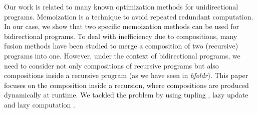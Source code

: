 
Our work is related to many known optimization methods for unidirectional programs. Memoization \cite{Bellman:2003:DP:862270,MICHIE1968} is a technique to avoid repeated redundant computation. In our case, we show that two specific memoization methods can be used for bidirectional programs.
To deal with inefficiency due to compositions, many fusion methods have been studied \cite{Wadler:1988:DTP:80099.80104} to merge a composition of two (recursive) programs into one. However, under the context of bidirectional programs, we need to consider not only compositions of recursive programs but also compositions inside a recursive program (as we have seen in \mbox{\it bfoldr}). This paper focuses on the composition inside a recursion, where compositions are produced dynamically at runtime. We tackled the problem by using tupling \cite{Fokkinga90}, lazy update and lazy computation \cite{Henderson:1976:LE:800168.811543, Hudak:2007:HHL:1238844.1238856}.






